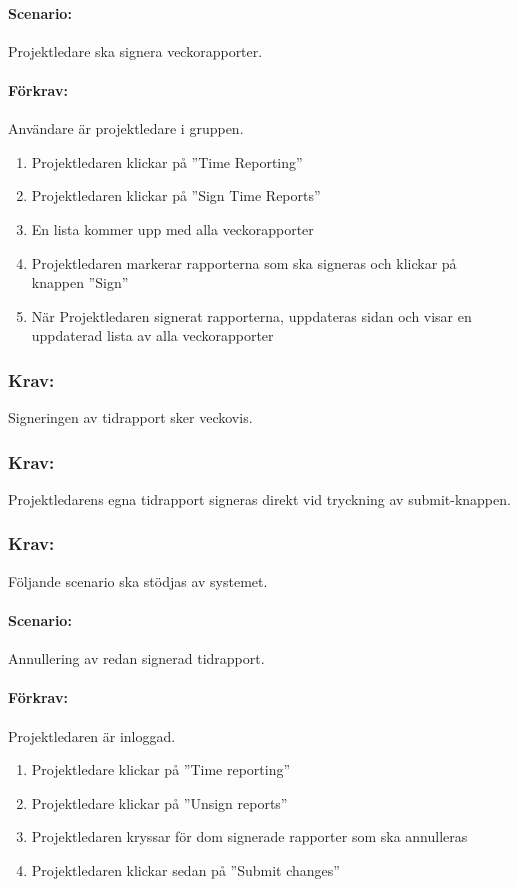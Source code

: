 \documentclass[paper=a4, fontsize=11pt,twoside]{article}
\begin{document}
\paragraph{Scenario:}
Projektledare ska signera veckorapporter.
\paragraph{Förkrav:}
Användare är projektledare i gruppen.
\begin{enumerate}
\item Projektledaren klickar på ”Time Reporting”
\item Projektledaren klickar på ”Sign Time Reports”
\item En lista kommer upp med alla veckorapporter
\item Projektledaren markerar rapporterna som ska signeras och klickar på knappen ”Sign”
\item När Projektledaren signerat rapporterna, uppdateras sidan och visar en uppdaterad lista av alla veckorapporter
\end{enumerate}

\subsubsection{Krav:}
Signeringen av tidrapport sker veckovis.

\subsubsection{Krav:}
Projektledarens egna tidrapport signeras direkt vid tryckning av submit-knappen.

\subsubsection{Krav:}
Följande scenario ska stödjas av systemet.
\paragraph{Scenario:} Annullering av redan signerad tidrapport.
\paragraph{Förkrav:} Projektledaren är inloggad.
\begin{enumerate}
\item Projektledare klickar på ”Time reporting”
\item Projektledare klickar på ”Unsign reports”
\item Projektledaren kryssar för dom signerade rapporter som ska annulleras
\item Projektledaren klickar sedan på ”Submit changes”
\end{enumerate}
\end{document}
